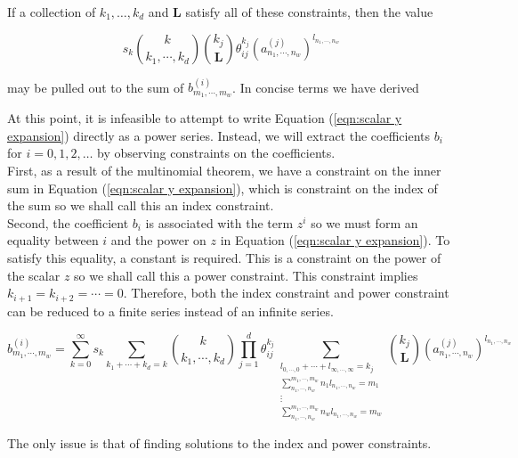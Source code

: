 If a collection of $k_1, \ldots, k_d$ and $\mathbf{L}$ satisfy all of these constraints, then the value

\begin{equation*}
    s_k \binom{k}{k_1, \cdots, k_d} \binom{k_j}{\mathbf{L}} \theta_{ij}^{k_j} (a^{(j)}_{n_1, \cdots, n_w})^{l_{n_1, \cdots, n_w}}
\end{equation*}

may be pulled out to the sum of $b^{(i)}_{m_1, \cdots, m_w}$. In concise terms we have derived

{\color{red} At this point, it is infeasible to attempt to write Equation (\ref{eqn:scalar y expansion}) directly as a power series. Instead, we will extract the coefficients $b_i$ for $i = 0, 1, 2, \ldots$ by observing constraints on the coefficients.\\

First, as a result of the multinomial theorem, we have a constraint on the inner sum in Equation (\ref{eqn:scalar y expansion}), which is constraint on the index of the sum so we shall call this an index constraint.\\

Second, the coefficient $b_i$ is associated with the term $z^i$ so we must form an equality between $i$ and the power on $z$ in Equation (\ref{eqn:scalar y expansion}). To satisfy this equality, a constant is required. This is a constraint on the power of the scalar $z$ so we shall call this a power constraint. This constraint implies $k_{i + 1} = k_{i + 2} = \cdots = 0$. Therefore, both the index constraint and power constraint can be reduced to a finite series instead of an infinite series.}

\begin{equation}
    b^{(i)}_{m_1, \cdots, m_w} = \sum_{k=0}^{\infty} s_k \sum_{k_1 + \cdots + k_d = k} \binom{k}{k_1, \cdots, k_d} \prod_{j=1}^{d} \theta_{ij}^{k_j} \sum_{\substack{l_{0, \cdots, 0} + \cdots + l_{\infty, \cdots, \infty} = k_j \\ \sum_{n_1, \cdots, n_w}^{m_1, \cdots, m_w} n_1 l_{n_1, \cdots, n_w} = m_1 \\ \vdots \\ \sum_{n_1, \cdots, n_w}^{m_1, \cdots, m_w} n_w l_{n_1, \cdots, n_w} = m_w}} \binom{k_j}{\mathbf{L}} (a^{(j)}_{n_1, \cdots, n_w})^{l_{n_1, \cdots, n_w}}
\end{equation}

The only issue is that of finding solutions to the index and power constraints.


